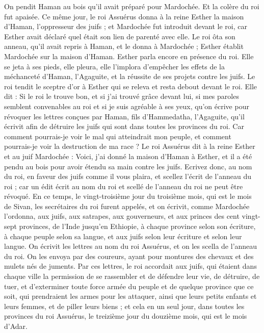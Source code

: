 \begin{multicols}{2}
On pendit Haman au bois qu'il avait préparé pour Mardochée. Et la colère du roi fut apaisée.
\VerseOne{}Ce même jour, le roi Assuérus donna à la reine Esther la maison d'Haman, l'oppresseur des juifs ; et Mardochée fut introduit devant le roi, car Esther avait déclaré quel était son lien de parenté avec elle.
Le roi ôta son anneau, qu'il avait repris à Haman, et le donna à Mardochée ; Esther établit Mardochée sur la maison d'Haman.
Esther parla encore en présence du roi. Elle se jeta à ses pieds, elle pleura, elle l’implora d’empêcher les effets de la méchanceté d'Haman, l’Agaguite, et la réussite de ses projets contre les juifs.
Le roi tendit le sceptre d'or à Esther qui se releva et resta debout devant le roi.
Elle dit : Si le roi le trouve bon, et si j'ai trouvé grâce devant lui, si mes paroles semblent convenables au roi et si je suis agréable à ses yeux, qu'on écrive pour révoquer les lettres conçues par Haman, fils d'Hammedatha, l’Agaguite, qu'il écrivit afin de détruire les juifs qui sont dans toutes les provinces du roi.
Car comment pourrais-je voir le mal qui atteindrait mon peuple, et comment pourrais-je voir la destruction de ma race ?
Le roi Assuérus dit à la reine Esther et au juif Mardochée : Voici, j'ai donné la maison d'Haman à Esther, et il a été pendu au bois pour avoir étendu sa main contre les juifs.
Ecrivez donc, au nom du roi, en faveur des juifs comme il vous plaira, et scellez l'écrit de l'anneau du roi ; car un édit écrit au nom du roi et scellé de l'anneau du roi ne peut être révoqué.
En ce temps, le vingt-troisième jour du troisième mois, qui est le mois de Sivan, les secrétaires du roi furent appelés, et on écrivit, comme Mardochée l’ordonna, aux juifs, aux satrapes, aux gouverneurs, et aux princes des cent vingt-sept provinces, de l’Inde jusqu'en Ethiopie, à chaque province selon son écriture, à chaque peuple selon sa langue, et aux juifs selon leur écriture et selon leur langue.
On écrivit les lettres au nom du roi Assuérus, et on les scella de l'anneau du roi. On les envoya par des coureurs, ayant pour montures des chevaux et des mulets nés de juments.
Par ces lettres, le roi accordait aux juifs, qui étaient dans chaque ville la permission de se rassembler et de défendre leur vie, de détruire, de tuer, et d’exterminer toute force armée du peuple et de quelque province que ce soit, qui prendraient les armes pour les attaquer, ainsi que leurs petits enfants et leurs femmes, et de piller leurs biens ;
et cela en un seul jour, dans toutes les provinces du roi Assuérus, le treizième jour du douzième mois, qui est le mois d'Adar.

\end{multicols}
